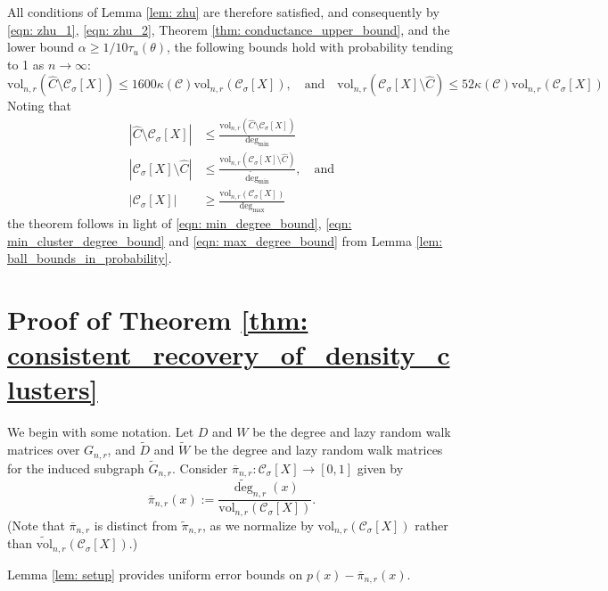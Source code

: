 \documentclass[11pt,twoside]{article}
\newcommand{\vol}{\mathrm{vol}}
\newcommand{\abs}[1]{\left \lvert #1 \right \rvert}
\newcommand{\1}{\mathbf{1}}
\newcommand{\pbf}{p}        %
\newcommand{\pibf}{\pi}
\newcommand{\Xbf}{X}             %
\newcommand{\Wbf}{W}
\newcommand{\Dbf}{D}
\newcommand{\Cset}{\mathcal{C}}
\newcommand{\Csig}{\Cset_{\sigma}}
\newcommand{\degminwt}{\widetilde{\deg}_{\min}}
\newcommand{\degmax}{\deg_{\max}}
\newcommand{\degmin}{\deg_{\min}}
\begin{document}
All conditions of Lemma \ref{lem: zhu} are therefore satisfied, and consequently by \eqref{eqn: zhu_1}, \eqref{eqn: zhu_2}, Theorem \ref{thm: conductance_upper_bound}, and the lower bound $\alpha \geq 1/10\tau_u(\theta)$, the following bounds hold with probability tending to 1 as $n \to \infty$:
\begin{equation*}
\vol_{n,r}(\widehat{C} \setminus \Csig[\Xbf]) \leq 1600 \kappa(\Cset) \vol_{n,r}(\Csig[\Xbf]), \quad \textrm{and} \quad  \vol_{n,r}(\Csig[\Xbf] \setminus \widehat{C}) \leq 52 \kappa(\Cset) \vol_{n,r}(\Csig[\Xbf])
\end{equation*}
Noting that
\begin{align*}
\abs{\widehat{C} \setminus \Csig[\Xbf]} & \leq \frac{\vol_{n,r}(\widehat{C} \setminus \Csig[\Xbf])}{\degmin}   \\
\abs{\Csig[\Xbf] \setminus \widehat{C}} & \leq \frac{\vol_{n,r}(\Csig[\Xbf] \setminus \widehat{C})}{\degminwt}, \quad \textrm{and} \\
\abs{\Csig[\Xbf]} & \geq \frac{\vol_{n,r}(\Csig[\Xbf])}{\degmax}
\end{align*}
the theorem follows in light of \eqref{eqn: min_degree_bound}, \eqref{eqn: min_cluster_degree_bound} and \eqref{eqn: max_degree_bound} from Lemma \ref{lem: ball_bounds_in_probability}.



\section{Proof of Theorem \ref{thm: consistent_recovery_of_density_clusters}}
\label{sec: proof_of_consistent_cluster_recovery}

We begin with some notation. Let $\Dbf$ and $\Wbf$ be the degree and lazy random walk matrices over $G_{n,r}$, and $\widetilde{\Dbf}$ and $\widetilde{\Wbf}$ be the degree and lazy random walk matrices for the induced subgraph $\widetilde{G}_{n,r}$. Consider $\overline{\pibf}_{n,r}: \Csig[\Xbf] \to [0,1]$ given by
\begin{equation*}
\overline{\pibf}_{n,r}(x) := \frac{\widetilde{\deg}_{n,r}(x)}{\vol_{n,r}(\Csig[\Xbf])}.
\end{equation*}
(Note that $\overline{\pibf}_{n,r}$ is distinct from $\widetilde{\pibf}_{n,r}$, as we normalize by $\vol_{n,r}(\Csig[\Xbf])$ rather than $\widetilde{\vol}_{n,r}(\Csig[\Xbf])$.)

Lemma \ref{lem: setup} provides uniform error bounds on $\pbf(x) - \overline{\pibf}_{n,r}(x)$. 
\end{document}
